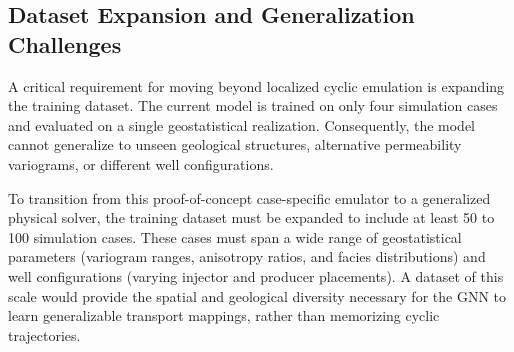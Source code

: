 \subsection{Dataset Expansion and Generalization Challenges}
A critical requirement for moving beyond localized cyclic emulation is expanding the training dataset. The current model is trained on only four simulation cases and evaluated on a single geostatistical realization. Consequently, the model cannot generalize to unseen geological structures, alternative permeability variograms, or different well configurations. 

To transition from this proof-of-concept case-specific emulator to a generalized physical solver, the training dataset must be expanded to include at least 50 to 100 simulation cases. These cases must span a wide range of geostatistical parameters (variogram ranges, anisotropy ratios, and facies distributions) and well configurations (varying injector and producer placements). A dataset of this scale would provide the spatial and geological diversity necessary for the GNN to learn generalizable transport mappings, rather than memorizing cyclic trajectories.
